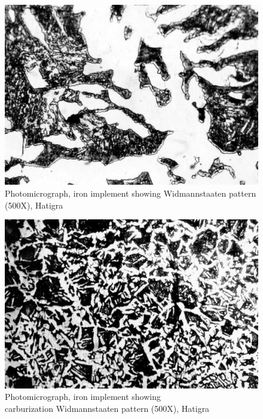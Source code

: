 \begin{figure}[H]
\renewcommand{\thefigure}{18A}
\includegraphics[scale=1]{images/chapter-4/fig018A.jpg}
\caption{Photomicrograph, iron implement showing Widmannstaaten pattern (500X), Hatigra }\label{chapter-4-fig18A}
\end{figure}
\begin{figure}[H]
\renewcommand{\thefigure}{18B}
\includegraphics[scale=1]{images/chapter-4/fig018B.jpg}
\caption{Photomicrograph, iron implement showing\\ carburization  Widmannstaaten pattern (500X), Hatigra}\label{chapter-4-fig18B}
\end{figure}

\newpage

